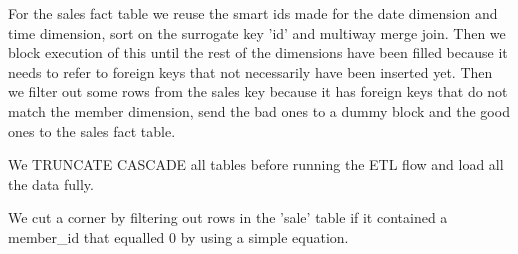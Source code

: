     For the sales fact table we reuse the smart ids made for the date dimension and time dimension, sort on the surrogate key 'id' and multiway merge join. Then we block execution of this until the rest of the dimensions have been filled because it needs to refer to foreign keys that not necessarily have been inserted yet. Then we filter out some rows from the sales key because it has foreign keys that do not match the member dimension, send the bad ones to a dummy block and the good ones to the sales fact table.
       
    We TRUNCATE CASCADE all tables before running the ETL flow and load all the data fully.
    
    We cut a corner by filtering out rows in the 'sale' table if it contained a member\_id that equalled 0 by using a simple equation.


